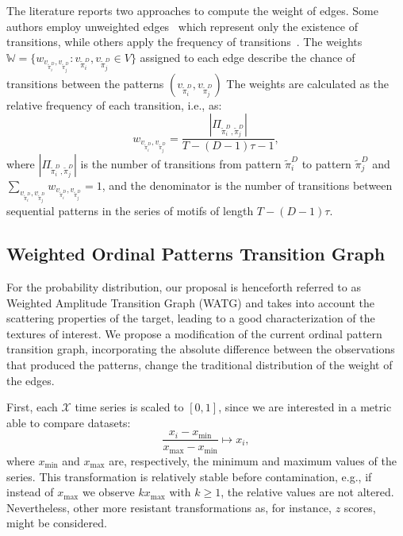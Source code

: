 \documentclass[journal]{IEEEtran}
\begin{document}
	The literature reports two approaches to compute the weight of edges.
	Some authors employ unweighted edges~\cite{McCullough2015lagged,Kulp2016ordinal} which represent only the existence of transitions, while others apply the frequency of transitions~\cite{Sorrentino2015periodic,Zhang2017ConstructingOP}.
	The weights $\mathbb{W} = \{w_{v_{\widetilde{\pi}^D_i}, v_{\widetilde\pi^D_j}}: v_{\widetilde\pi^D_i}, v_{\widetilde\pi^D_j} \in V \}$ assigned to each edge describe the chance of transitions between the patterns $(v_{\widetilde\pi^D_i}, v_{\widetilde\pi^D_j})$
	The weights are calculated as the relative frequency of each transition, i.e., as:
	\begin{equation}
		w_{v_{\widetilde\pi^D_i}, v_{\widetilde\pi^D_j}} = \frac{|\Pi_{\widetilde\pi^D_i,\widetilde\pi^D_j}|}{T-(D-1)\tau-1},
	\end{equation}
	where $|\Pi_{\widetilde\pi^D_i,\widetilde\pi^D_j}|$ is the number of transitions from pattern $\widetilde\pi^D_i$ to pattern $\widetilde\pi^D_j$ and $\sum_{v_{\widetilde\pi^D_i}, v_{\widetilde\pi^D_j}}w_{v_{\widetilde\pi^D_i}, v_{\widetilde\pi^D_j}} = 1$,
	and the denominator is the number of transitions between sequential patterns in the series of motifs of length $T-(D-1)\tau$.
	
	\subsection{Weighted Ordinal Patterns Transition Graph}\label{WATG}
	
	For the probability distribution, our proposal is henceforth referred to as Weighted Amplitude Transition Graph (WATG) and takes into account the scattering properties of the target, leading to a good characterization of the textures of interest.
	We propose a modification of the current ordinal pattern transition graph, incorporating the absolute difference between the observations that produced the patterns, change the traditional distribution of the weight of the edges.
	
	First, each $\mathcal{X}$ time series is scaled to $[0, 1]$, since we are interested in a metric able to compare datasets:
	\begin{equation}
		\frac{x_i - x_{\min}}{x_{\max} - x_{\min}} \longmapsto x_i,
	\end{equation}
	where $x_{\min}$ and $x_{\max}$ are, respectively, the minimum and maximum values of the series.
	This transformation is relatively stable before contamination, e.g., if instead of $x_{\max}$ we observe $k x_{\max}$ with $k\geq 1$, the relative values are not altered. Nevertheless, other more resistant transformations as, for instance, $z$ scores, might be considered.
	
\end{document}
